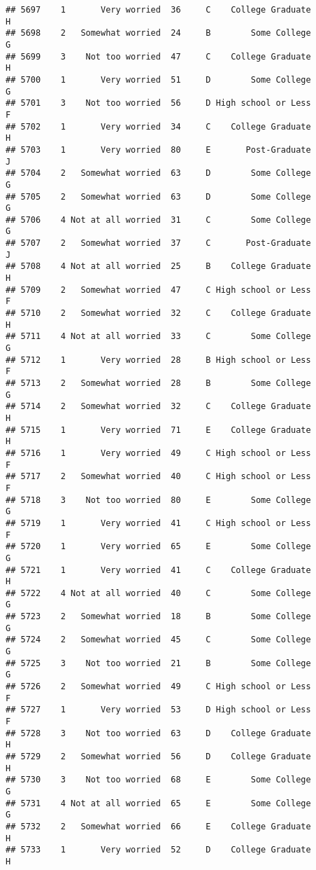 \documentclass[
]{article}
\begin{document}
\begin{verbatim}
## 5697    1       Very worried  36     C    College Graduate         H
## 5698    2   Somewhat worried  24     B        Some College         G
## 5699    3    Not too worried  47     C    College Graduate         H
## 5700    1       Very worried  51     D        Some College         G
## 5701    3    Not too worried  56     D High school or Less         F
## 5702    1       Very worried  34     C    College Graduate         H
## 5703    1       Very worried  80     E       Post-Graduate         J
## 5704    2   Somewhat worried  63     D        Some College         G
## 5705    2   Somewhat worried  63     D        Some College         G
## 5706    4 Not at all worried  31     C        Some College         G
## 5707    2   Somewhat worried  37     C       Post-Graduate         J
## 5708    4 Not at all worried  25     B    College Graduate         H
## 5709    2   Somewhat worried  47     C High school or Less         F
## 5710    2   Somewhat worried  32     C    College Graduate         H
## 5711    4 Not at all worried  33     C        Some College         G
## 5712    1       Very worried  28     B High school or Less         F
## 5713    2   Somewhat worried  28     B        Some College         G
## 5714    2   Somewhat worried  32     C    College Graduate         H
## 5715    1       Very worried  71     E    College Graduate         H
## 5716    1       Very worried  49     C High school or Less         F
## 5717    2   Somewhat worried  40     C High school or Less         F
## 5718    3    Not too worried  80     E        Some College         G
## 5719    1       Very worried  41     C High school or Less         F
## 5720    1       Very worried  65     E        Some College         G
## 5721    1       Very worried  41     C    College Graduate         H
## 5722    4 Not at all worried  40     C        Some College         G
## 5723    2   Somewhat worried  18     B        Some College         G
## 5724    2   Somewhat worried  45     C        Some College         G
## 5725    3    Not too worried  21     B        Some College         G
## 5726    2   Somewhat worried  49     C High school or Less         F
## 5727    1       Very worried  53     D High school or Less         F
## 5728    3    Not too worried  63     D    College Graduate         H
## 5729    2   Somewhat worried  56     D    College Graduate         H
## 5730    3    Not too worried  68     E        Some College         G
## 5731    4 Not at all worried  65     E        Some College         G
## 5732    2   Somewhat worried  66     E    College Graduate         H
## 5733    1       Very worried  52     D    College Graduate         H

\end{verbatim}
\end{document}
